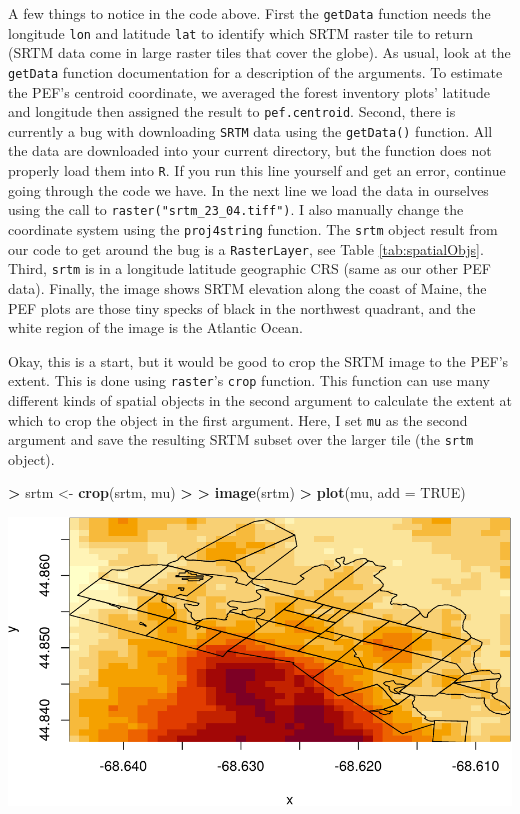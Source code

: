 \documentclass[]{krantz}
\makeatletter
\newenvironment{Shaded}{\begin{snugshade}}{\end{snugshade}}
\newcommand{\DataTypeTok}[1]{\textcolor[rgb]{0.27,0.27,0.27}{#1}}
\newcommand{\ErrorTok}[1]{\textcolor[rgb]{0.14,0.14,0.14}{\textbf{#1}}}
\newcommand{\KeywordTok}[1]{\textcolor[rgb]{0.27,0.27,0.27}{\textbf{#1}}}
\newcommand{\NormalTok}[1]{#1}
\newcommand{\OperatorTok}[1]{\textcolor[rgb]{0.43,0.43,0.43}{\textbf{#1}}}
\newcommand{\OtherTok}[1]{\textcolor[rgb]{0.37,0.37,0.37}{#1}}
\newcommand{\StringTok}[1]{\textcolor[rgb]{0.5,0.5,0.5}{#1}}
\newenvironment{kframe}{%
\medskip{}
\setlength{\fboxsep}{.8em}
 \def\at@end@of@kframe{}%
 \ifinner\ifhmode%
  \def\at@end@of@kframe{\end{minipage}}%
  \begin{minipage}{\columnwidth}%
 \fi\fi%
 \def\FrameCommand##1{\hskip\@totalleftmargin \hskip-\fboxsep
 \colorbox{shadecolor}{##1}\hskip-\fboxsep
     \hskip-\linewidth \hskip-\@totalleftmargin \hskip\columnwidth}%
 \MakeFramed {\advance\hsize-\width
   \@totalleftmargin\z@ \linewidth\hsize
   \@setminipage}}%
 {\par\unskip\endMakeFramed%
 \at@end@of@kframe}
\renewenvironment{Shaded}{\begin{kframe}}{\end{kframe}}
\makeatother
\begin{document}
A few things to notice in the code above. First the \texttt{getData} function needs the longitude \texttt{lon} and latitude \texttt{lat} to identify which SRTM raster tile to return (SRTM data come in large raster tiles that cover the globe). As usual, look at the \texttt{getData} function documentation for a description of the arguments. To estimate the PEF's centroid coordinate, we averaged the forest inventory plots' latitude and longitude then assigned the result to \texttt{pef.centroid}. Second, there is currently a bug with downloading \texttt{SRTM} data using the \texttt{getData()} function. All the data are downloaded into your current directory, but the function does not properly load them into \texttt{R}. If you run this line yourself and get an error, continue going through the code we have. In the next line we load the data in ourselves using the call to \texttt{raster("srtm\_23\_04.tiff")}. I also manually change the coordinate system using the \texttt{proj4string} function. The \texttt{srtm} object result from our code to get around the bug is a \texttt{RasterLayer}, see Table \ref{tab:spatialObjs}. Third, \texttt{srtm} is in a longitude latitude geographic CRS (same as our other PEF data). Finally, the image shows SRTM elevation along the coast of Maine, the PEF plots are those tiny specks of black in the northwest quadrant, and the white region of the image is the Atlantic Ocean.

Okay, this is a start, but it would be good to crop the SRTM image to the PEF's extent. This is done using \texttt{raster}'s \texttt{crop} function. This function can use many different kinds of spatial objects in the second argument to calculate the extent at which to crop the object in the first argument. Here, I set \texttt{mu} as the second argument and save the resulting SRTM subset over the larger tile (the \texttt{srtm} object).

\begin{Shaded}
\begin{Highlighting}[]
\OperatorTok{>}\StringTok{ }\NormalTok{srtm <-}\StringTok{ }\KeywordTok{crop}\NormalTok{(srtm, mu)}
\OperatorTok{>}\StringTok{ }
\ErrorTok{>}\StringTok{ }\KeywordTok{image}\NormalTok{(srtm)}
\OperatorTok{>}\StringTok{ }\KeywordTok{plot}\NormalTok{(mu, }\DataTypeTok{add =} \OtherTok{TRUE}\NormalTok{)}
\end{Highlighting}
\end{Shaded}

\includegraphics{bookdown_files/figure-latex/unnamed-chunk-198-1.pdf}
\end{document}
